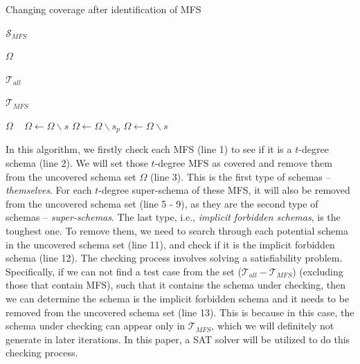 \documentclass[10pt,journal,compsoc]{IEEEtran}
\begin{document}
\begin{algorithm}
  \caption{Changing coverage after identification of MFS}
  \begin{algorithmic}[1]
     \Require



     $\mathcal{S}_{MFS}$ 

     $\Omega$ 


     $\mathcal{T}_{all}$ 

     $\mathcal{T}_{MFS}$ 

\Ensure  $\Omega$ 
\
          \State $\Omega \leftarrow \Omega \backslash s$
       \EndIf
          \State $\Omega \leftarrow \Omega \backslash s_{p}$
         \EndIf
       \EndFor
     \EndFor
         \State  $\Omega \leftarrow \Omega \backslash s$
       \EndIf
     \EndFor
  \end{algorithmic}
\end{algorithm}

 In this algorithm, we firstly check each MFS (line 1) to see if it is a $t$-degree schema (line 2). We will set those $t$-degree MFS as covered and remove them from the uncovered schema set $\Omega$ (line 3). This is the first type of schemas --\emph{themselves}. For each $t$-degree super-schema of these MFS, it will also be removed from the uncovered schema set (line 5 - 9), as they are the second type of schemas --  \emph{super-schemas}. The last type, i.e., \emph{implicit forbidden schemas}, is the toughest one. To remove them, we need to search through each potential schema in the uncovered schema set (line 11), and check if it is the implicit forbidden schema (line 12). The checking process involves solving a satisfiability problem. Specifically, if we can not find a test case from  the set ($\mathcal{T}_{all} - \mathcal{T}_{MFS}$) (excluding those that contain MFS), such that it contains the schema under checking, then we can determine the schema is the implicit forbidden schema and it needs to be removed from the uncovered schema set (line 13). This is because in this case, the schema under checking can appear only in $\mathcal{T}_{MFS}$, which we will definitely not generate in later iterations.
 In this paper, a SAT solver will be utilized to do this checking process.
\end{document}

